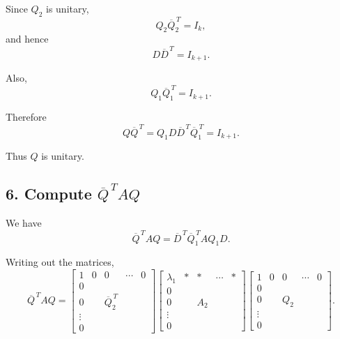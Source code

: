 \documentclass[12pt,a4paper]{article}
\begin{document}
Since $Q_2$ is unitary,
\[
    Q_2\overline{Q}_2^{\,T}=I_k,
\]
and hence
\[
    D\overline{D}^{\,T}=I_{k+1}.
\]

Also,
\[
    Q_1\overline{Q}_1^{\,T}=I_{k+1}.
\]

Therefore
\[
    Q\overline{Q}^{\,T}
    =
    Q_1D\overline{D}^{\,T}\overline{Q}_1^{\,T}
    =
    I_{k+1}.
\]

Thus $Q$ is unitary.

\subsection*{6. Compute $\overline{Q}^{\,T}AQ$}

We have
\[
    \overline{Q}^{\,T}AQ
    =
    \overline{D}^{\,T}
    \overline{Q}_1^{\,T}AQ_1
    D.
\]

Writing out the matrices,
\[
    \overline{Q}^{\,T}AQ
    =
    \left[
        \begin{array}{ccccc}
            1      & 0 & 0                    & \cdots & 0 \\
            0      &   &                      &        &   \\
            0      &   & \overline{Q}_2^{\,T} &        &   \\
            \vdots &   &                      &        &   \\
            0      &   &                      &        &
        \end{array}
        \right]
    \left[
        \begin{array}{ccccc}
            \lambda_1 & * & *   & \cdots & * \\
            0         &   &     &        &   \\
            0         &   & A_2 &        &   \\
            \vdots    &   &     &        &   \\
            0         &   &     &        &
        \end{array}
        \right]
    \left[
        \begin{array}{ccccc}
            1      & 0 & 0   & \cdots & 0 \\
            0      &   &     &        &   \\
            0      &   & Q_2 &        &   \\
            \vdots &   &     &        &   \\
            0      &   &     &        &
        \end{array}
        \right].
\]
\end{document}
